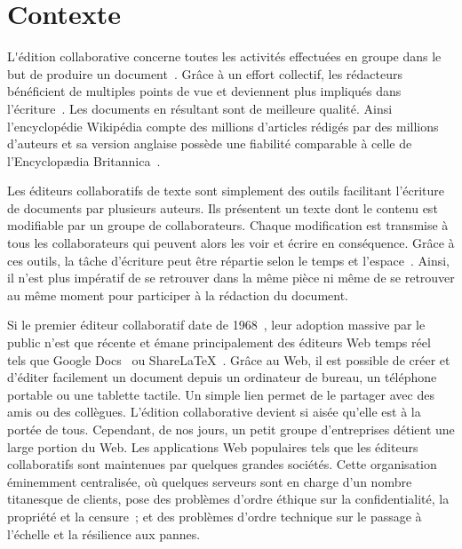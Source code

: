 
\section{Contexte}

\lettrine{L}'édition collaborative concerne toutes les activités effectuées en
groupe dans le but de produire un document~\cite{ellis1989concurrency,
  johansen1988groupware}. Grâce à un effort collectif, les rédacteurs
bénéficient de multiples points de vue et deviennent plus impliqués dans
l'écriture~\cite{noel2004empirical}. Les documents en résultant sont de
meilleure qualité. Ainsi l'encyclopédie Wikipédia compte des millions d'articles
rédigés par des millions d'auteurs et sa version anglaise possède une fiabilité
comparable à celle de l'Encyclopædia Britannica~\cite{giles2005internet}.

Les éditeurs collaboratifs de texte sont simplement des outils facilitant
l'écriture de documents par plusieurs auteurs. Ils présentent un texte dont le
contenu est modifiable par un groupe de collaborateurs. Chaque modification est
transmise à tous les collaborateurs qui peuvent alors les voir et écrire en
conséquence. Grâce à ces outils, la tâche d'écriture peut être répartie selon le
temps et l'espace~\cite{desanctis1987foundation, grudin1994computersupported,
  johansen1988groupware}. Ainsi, il n'est plus impératif de se retrouver dans la
même pièce ni même de se retrouver au même moment pour participer à la rédaction
du document.

Si le premier éditeur collaboratif date de 1968~\cite{engelbart1968research},
leur adoption massive par le public n'est que récente
et émane principalement des éditeurs Web temps réel~\cite{mogan2010impact,
  perkel2014scientific} tels que Google Docs~\cite{googledocs} ou
ShareLaTeX~\cite{sharelatex}. Grâce au Web, il est possible de créer et d'éditer
facilement un document depuis un ordinateur de bureau, un téléphone portable ou
une tablette tactile. Un simple lien permet de le partager avec des amis ou des
collègues. L'édition collaborative devient si aisée qu'elle est à la portée de
tous.  Cependant, de nos jours, un petit groupe d'entreprises détient une
large portion du Web. Les applications Web populaires tels que les éditeurs
collaboratifs sont maintenues par quelques grandes sociétés. 
Cette organisation éminemment centralisée, où quelques serveurs sont en charge
d'un nombre titanesque de clients, pose des problèmes d'ordre éthique sur la
confidentialité, la propriété et la censure~\cite{cherrueau2016composer,
  gellman2013us, pearson2011toward}; et des problèmes d'ordre technique sur le
passage à l'échelle et la résilience aux pannes.

